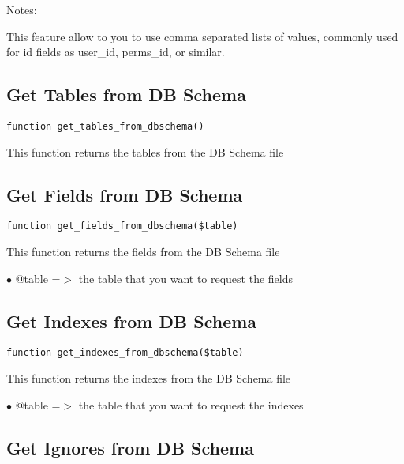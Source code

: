 \documentclass[a4paper]{book}
\begin{document}
Notes:

This feature allow to you to use comma separated lists of values, commonly used for id
fields as user\_id, perms\_id, or similar.

\hypertarget{toc89}{}
\subsection{Get Tables from DB Schema}

\begin{lstlisting}
function get_tables_from_dbschema()
\end{lstlisting}

This function returns the tables from the DB Schema file

\hypertarget{toc90}{}
\subsection{Get Fields from DB Schema}

\begin{lstlisting}
function get_fields_from_dbschema($table)
\end{lstlisting}

This function returns the fields from the DB Schema file

\begin{compactitem}
\item[\color{myblue}$\bullet$] @table =$>$ the table that you want to request the fields
\end{compactitem}

\hypertarget{toc91}{}
\subsection{Get Indexes from DB Schema}

\begin{lstlisting}
function get_indexes_from_dbschema($table)
\end{lstlisting}

This function returns the indexes from the DB Schema file

\begin{compactitem}
\item[\color{myblue}$\bullet$] @table =$>$ the table that you want to request the indexes
\end{compactitem}

\hypertarget{toc92}{}
\subsection{Get Ignores from DB Schema}
\end{document}
